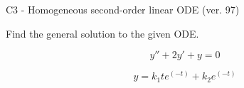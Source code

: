 \begin{exercise}
  \begin{exerciseTitle}C3 - Homogeneous second-order linear ODE (ver. 97)\end{exerciseTitle}
  \begin{exerciseStatement}
    
Find the general solution to the given ODE.

    
\[y''+2y'+y = 0\]

  \end{exerciseStatement}
  \begin{exerciseAnswer}
    
\[y= k_{1} t e^{\left(-t\right)} + k_{2} e^{\left(-t\right)}\]

  \end{exerciseAnswer}
\end{exercise}